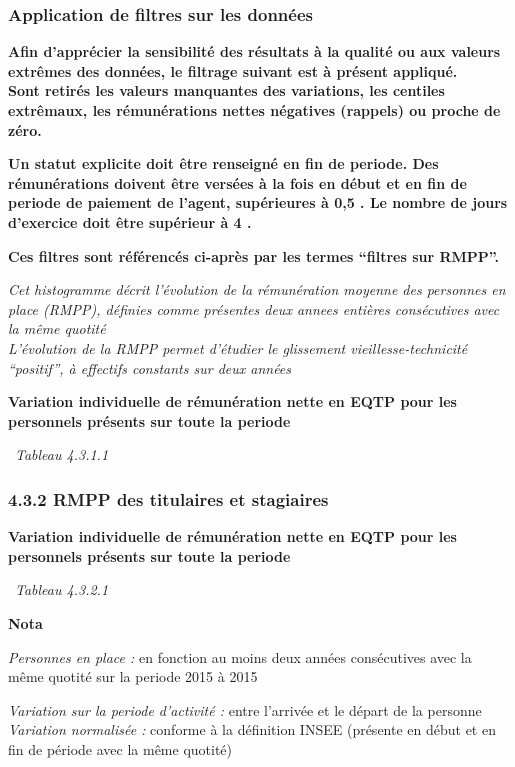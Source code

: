 \hypertarget{application-de-filtres-sur-les-donnees}{%
\subsubsection{Application de filtres sur les
données}\label{application-de-filtres-sur-les-donnees}}

\textbf{Afin d'apprécier la sensibilité des résultats à la qualité ou
aux valeurs extrêmes des données, le filtrage suivant est à présent
appliqué.}\\
\textbf{Sont retirés les valeurs manquantes des variations, les centiles
extrêmaux, les rémunérations nettes négatives (rappels) ou proche de
zéro.}

\textbf{Un statut explicite doit être renseigné en fin de periode. Des
rémunérations doivent être versées à la fois en début et en fin de
periode de paiement de l'agent, supérieures à 0,5 . Le nombre de jours
d'exercice doit être supérieur à 4 .}

\textbf{Ces filtres sont référencés ci-après par les termes ``filtres
sur RMPP''.}

\emph{Cet histogramme décrit l'évolution de la rémunération moyenne des
personnes en place (RMPP), définies comme présentes deux annees entières
consécutives avec la même quotité}\\
\emph{L'évolution de la RMPP permet d'étudier le glissement
vieillesse-technicité ``positif'', à effectifs constants sur deux
années}

\textbf{Variation individuelle de rémunération nette en EQTP pour les
personnels présents sur toute la periode}

~\emph{Tableau 4.3.1.1}

\hypertarget{rmpp-des-titulaires-et-stagiaires}{%
\subsubsection{4.3.2 RMPP des titulaires et
stagiaires}\label{rmpp-des-titulaires-et-stagiaires}}

\textbf{Variation individuelle de rémunération nette en EQTP pour les
personnels présents sur toute la periode}

~\emph{Tableau 4.3.2.1}

\textbf{Nota}

\emph{Personnes en place :} en fonction au moins deux années
consécutives avec la même quotité sur la periode 2015 à 2015

\emph{Variation sur la periode d'activité :} entre l'arrivée et le
départ de la personne\\
\emph{Variation normalisée :} conforme à la définition INSEE (présente
en début et en fin de période avec la même quotité)

